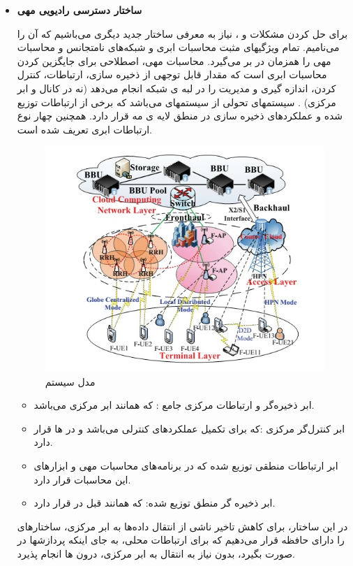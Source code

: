\begin{itemize}
\item \textbf{ساختار دسترسی رادیویی مهی}


برای حل کردن مشکلات  و ، نیاز به معرفی ساختار جدید دیگری می‌باشیم که آن را  می‌نامیم.
تمام ویژگیهای مثبت محاسبات ابری و شبکه‌های نامتجانس و محاسبات مهی را همزمان در بر می‌گیرد.
محاسبات مهی، اصطلاحی برای جایگزین کردن محاسبات ابری است که مقدار قابل توجهی از ذخیره سازی، ارتباطات، کنترل کردن، اندازه گیری و مدیریت را در لبه ی شبکه انجام می‌دهد (نه در کانال و ابر مرکزی) \cite{fogComputing, fogEdge}.
 سیستمهای  تحولی از سیستمهای  می‌باشد که برخی از ارتباطات توزیع شده و عملکردهای ذخیره سازی در منطق لایه ی مه قرار دارد. همچنین چهار نوع ارتباطات ابری تعریف شده است.
  \begin{figure}[H]
  \centering
    \includegraphics[scale =0.7]{./fig/fr}
  \caption{ مدل سیستم  \cite{fogComputing} }
  \label{fig:fr}
\end{figure}
 \begin{itemize}
 \item
 ابر ذخیره‌گر و ارتباطات مرکزی جامع :
 که همانند ابر مرکزی  می‌باشد.
 \item
 ابر کنترل‌گر مرکزی :که برای تکمیل عملکردهای کنترلی می‌باشد و در ها قرار دارد.
 \item
 ابر ارتباطات منطقی توزیع شده که در برنامه‌های محاسبات مهی و ابزارهای این محاسبات قرار دارد.
 \item
  ابر ذخیره گر منطق توزیع شده:
  که همانند قبل در  قرار دارد.
 \end{itemize}
 در این ساختار، برای کاهش تاخیر ناشی از انتقال داده‌ها به ابر مرکزی، ساختارهای  را دارای حافظه قرار می‌دهیم که برای ارتباطات محلی، به جای اینکه پردازشها در  صورت بگیرد، بدون نیاز به انتقال به ابر مرکزی، درون ها انجام پذیرد. 
\end{itemize}
